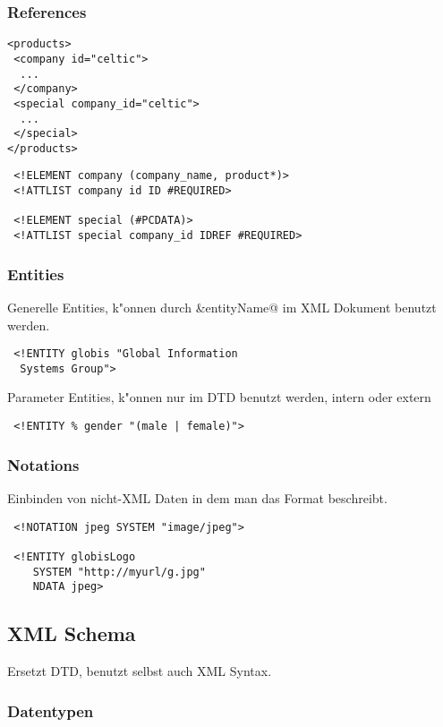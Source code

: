 \documentclass[german, 10pt, a4paper, twocolumn]{scrartcl}
\theoremstyle{definition}
\theoremstyle{remark}
\theoremstyle{example}
\begin{document}
\subsubsection{References}

\begin{verbatim}
<products>
 <company id="celtic">
  ...
 </company>
 <special company_id="celtic">
  ...
 </special>
</products>
\end{verbatim}

\begin{verbatim}
 <!ELEMENT company (company_name, product*)>
 <!ATTLIST company id ID #REQUIRED>

 <!ELEMENT special (#PCDATA)>
 <!ATTLIST special company_id IDREF #REQUIRED>
\end{verbatim}

\subsubsection{Entities}

Generelle Entities, k"onnen durch \verb@&entityName@ im XML Dokument benutzt werden.
\begin{verbatim}
 <!ENTITY globis "Global Information
  Systems Group">
\end{verbatim}

Parameter Entities, k"onnen nur im DTD benutzt werden, intern oder extern
\begin{verbatim}
 <!ENTITY % gender "(male | female)">
\end{verbatim}

\subsubsection{Notations}

Einbinden von nicht-XML Daten in dem man das Format beschreibt.

\begin{verbatim}
 <!NOTATION jpeg SYSTEM "image/jpeg">

 <!ENTITY globisLogo
    SYSTEM "http://myurl/g.jpg"
    NDATA jpeg>
\end{verbatim}

\subsection{XML Schema}

Ersetzt DTD, benutzt selbst auch XML Syntax.

\subsubsection{Datentypen}
\end{document}
